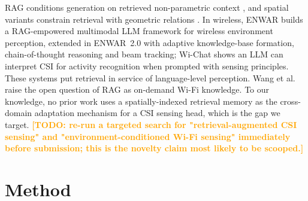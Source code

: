 \documentclass[conference]{IEEEtran}
\newcommand{\TODO}[1]{\textcolor{orange}{\textbf{[TODO: #1]}}}
\begin{document}
RAG conditions generation on retrieved non-parametric context \cite{lewis2020rag}, and
spatial variants constrain retrieval with geometric relations \cite{spatial_rag}. In
wireless, ENWAR \cite{Nazar2024Enwar} builds a RAG-empowered multimodal LLM framework for
wireless environment perception, extended in ENWAR~2.0 \cite{Nazar2026Enwar2} with adaptive
knowledge-base formation, chain-of-thought reasoning and beam tracking; Wi-Chat
\cite{wi_chat} shows an LLM can interpret CSI for activity recognition when prompted with
sensing principles. These systems put retrieval in service of language-level perception.
Wang et al.\ \cite{Wang2025GeneralizabilitySurvey} raise the open question of RAG as
on-demand Wi-Fi knowledge. To our knowledge, no prior work uses a spatially-indexed
retrieval memory as the cross-domain adaptation mechanism for a CSI sensing head, which is
the gap we target. \TODO{re-run a targeted search for "retrieval-augmented CSI sensing" and
"environment-conditioned Wi-Fi sensing" immediately before submission; this is the novelty
claim most likely to be scooped.}

\section{Method}
\label{sec:method}
\end{document}

